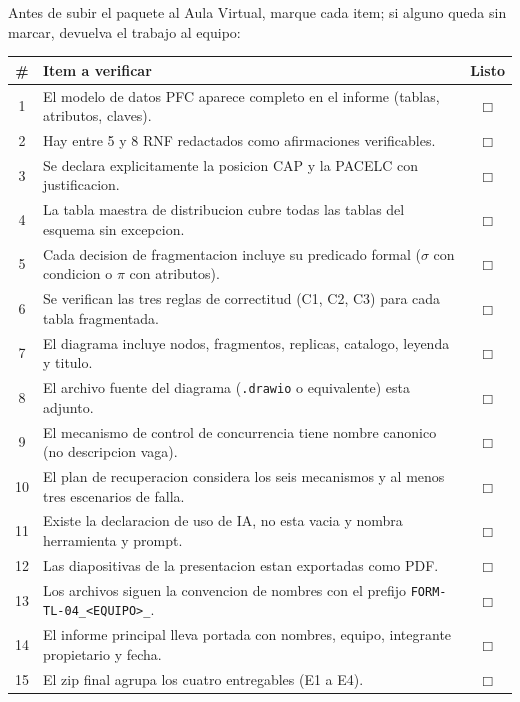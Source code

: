 \documentclass[11pt,a4paper]{article}
\newcommand{\codigo}[1]{\texttt{\textcolor{uteqBlue}{#1}}}
\begin{document}
Antes de subir el paquete al Aula Virtual, marque cada item; si alguno queda sin marcar, devuelva el trabajo al equipo:

\renewcommand{\arraystretch}{1.3}
\begin{xltabular}{\linewidth}{@{}cXc@{}}
\toprule
\textbf{\#} & \textbf{Item a verificar} & \textbf{Listo} \\
 & El modelo de datos PFC aparece completo en el informe (tablas, atributos, claves). & $\Box$ \\
2 & Hay entre 5 y 8 RNF redactados como afirmaciones verificables. & $\Box$ \\
3 & Se declara explicitamente la posicion CAP y la PACELC con justificacion. & $\Box$ \\
4 & La tabla maestra de distribucion cubre todas las tablas del esquema sin excepcion. & $\Box$ \\
5 & Cada decision de fragmentacion incluye su predicado formal ($\sigma$ con condicion o $\pi$ con atributos). & $\Box$ \\
6 & Se verifican las tres reglas de correctitud (C1, C2, C3) para cada tabla fragmentada. & $\Box$ \\
7 & El diagrama incluye nodos, fragmentos, replicas, catalogo, leyenda y titulo. & $\Box$ \\
8 & El archivo fuente del diagrama (\codigo{.drawio} o equivalente) esta adjunto. & $\Box$ \\
9 & El mecanismo de control de concurrencia tiene nombre canonico (no descripcion vaga). & $\Box$ \\
10 & El plan de recuperacion considera los seis mecanismos y al menos tres escenarios de falla. & $\Box$ \\
11 & Existe la declaracion de uso de IA, no esta vacia y nombra herramienta y prompt. & $\Box$ \\
12 & Las diapositivas de la presentacion estan exportadas como PDF. & $\Box$ \\
13 & Los archivos siguen la convencion de nombres con el prefijo \codigo{FORM-TL-04\_\textless EQUIPO\textgreater\_}. & $\Box$ \\
14 & El informe principal lleva portada con nombres, equipo, integrante propietario y fecha. & $\Box$ \\
15 & El zip final agrupa los cuatro entregables (E1 a E4). & $\Box$ \\
\bottomrule
\end{xltabular}

\end{document}
